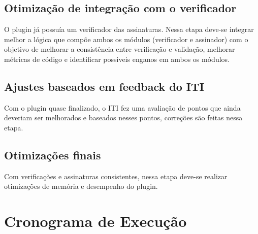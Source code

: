 \subsection{Otimização de integração com o verificador}

O plugin já possuía um verificador das assinaturas. Nessa etapa deve-se integrar melhor a lógica que compõe ambos os módulos (verificador e assinador)
com o objetivo de melhorar a consistência entre verificação e validação, melhorar métricas de código e identificar possiveis enganos em ambos os módulos.

\subsection{Ajustes baseados em feedback do ITI}

Com o plugin quase finalizado, o ITI fez uma avaliação de pontos que ainda deveriam ser melhorados e baseados nesses pontos, correções são feitas nessa etapa.

\subsection{Otimizações finais}

Com verificações e assinaturas consistentes, nessa etapa deve-se realizar otimizações de memória e desempenho do plugin.

\section{Cronograma de Execução}
\pagebreak

